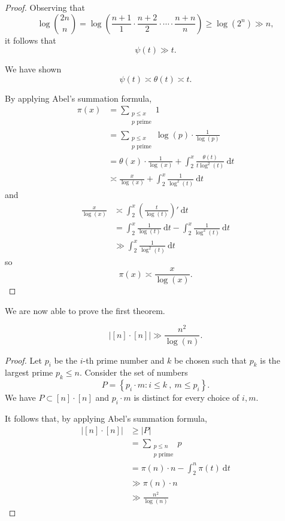 \documentclass[12pt,reqno]{amsart}
\begin{document}
\begin{proof}
Observing that
\[
    \log \binom{2n}{n} = \log \left( \frac{n+ 1}{1} \cdot \frac{n + 2}{2} \cdot \cdots \cdot \frac{n + n }{n}   \right) \geq \log \left( 2^{n} \right) \gg n
,\]
it follows that
\[
    \psi(t) \gg t
.\]

We have shown
\[
    \psi(t) \asymp \theta(t) \asymp t
.\]

By applying Abel's summation formula,
\begin{align*}
\pi(x) & = \sum _{\substack{ p \leq x \\ p \text{ prime}  }} 1\\
& = \sum _{\substack{ p \leq x \\ p \text{ prime}  }}  \log \left( p \right) \cdot \frac{1}{\log \left( p \right) } \\
& = \theta(x)\cdot \frac{1}{\log \left( x \right) } + \int_{2}^{x} \frac{\theta(t)}{t \log ^{2}\left( t \right) }  ~\mathrm{d} t\\
& \asymp \frac{x}{\log \left( x \right) } + \int_{2}^{x} \frac{1}{\log ^{2}\left( t \right) }  ~\mathrm{d} t 
\end{align*}
and
\begin{align*}
    \frac{x}{\log \left( x \right) } & \asymp \int_{2}^{x} \left( \frac{t}{\log \left( t \right) } \right) '  ~\mathrm{d} t \\
    & = \int_{2}^{x} \frac{1}{\log \left( t \right) }  ~\mathrm{d} t - \int_{2}^{x} \frac{1}{\log ^{2}\left( t \right) }  ~\mathrm{d} t \\
    & \gg \int_{2}^{x} \frac{1}{\log ^{2}\left( t \right) }  ~\mathrm{d} t 
\end{align*}
so
\[
    \pi(x) \asymp \frac{x}{\log \left( x \right) } 
.\]
\end{proof}

We are now able to prove the first theorem.

\begin{theorem*}
    \[
        \left\lvert [n] \cdot [n] \right\rvert \gg \frac{n ^{2}}{\log \left( n \right) }    
    .\]
\end{theorem*}

\begin{proof}
Let \(p_{i} \) be the \(i\)-th prime number and \(k\) be chosen such that \(p_{k} \) is the largest prime
\(p_{k} \leq n\). Consider the set of numbers
\[
    P = \left\{ p_{i} \cdot m : i \leq k ~,~ m \leq p_{i}  \right\} 
.\]
We have \(P \subset [n] \cdot [n]\) and \(p_{i} \cdot m\) is distinct for every choice of \(i,m\).

It follows that, by applying Abel's summation formula,
\begin{align*}
\left\lvert [n]\cdot [n] \right\rvert & \geq \left\lvert P \right\rvert \\
& = \sum _{\substack{ p \leq n \\ p \text{ prime}  }} p\\
& = \pi(n)\cdot n - \int_{2}^{n} \pi(t) ~\mathrm{d} t \\
& \gg \pi(n)\cdot n\\
& \gg \frac{n^{2}}{\log \left( n \right) } 
\end{align*}
\end{proof}
\end{document}

